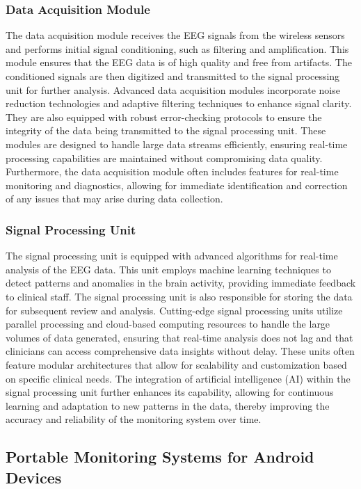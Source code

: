 \documentclass[12pt,journal,compsoc]{IEEEtran}
\begin{document}
\subsubsection{Data Acquisition Module}

The data acquisition module receives the EEG signals from the wireless sensors and performs initial signal conditioning, such as filtering and amplification. This module ensures that the EEG data is of high quality and free from artifacts. The conditioned signals are then digitized and transmitted to the signal processing unit for further analysis. Advanced data acquisition modules incorporate noise reduction technologies and adaptive filtering techniques to enhance signal clarity. They are also equipped with robust error-checking protocols to ensure the integrity of the data being transmitted to the signal processing unit. These modules are designed to handle large data streams efficiently, ensuring real-time processing capabilities are maintained without compromising data quality. Furthermore, the data acquisition module often includes features for real-time monitoring and diagnostics, allowing for immediate identification and correction of any issues that may arise during data collection.

\subsubsection{Signal Processing Unit}

The signal processing unit is equipped with advanced algorithms for real-time analysis of the EEG data. This unit employs machine learning techniques to detect patterns and anomalies in the brain activity, providing immediate feedback to clinical staff. The signal processing unit is also responsible for storing the data for subsequent review and analysis. Cutting-edge signal processing units utilize parallel processing and cloud-based computing resources to handle the large volumes of data generated, ensuring that real-time analysis does not lag and that clinicians can access comprehensive data insights without delay. These units often feature modular architectures that allow for scalability and customization based on specific clinical needs. The integration of artificial intelligence (AI) within the signal processing unit further enhances its capability, allowing for continuous learning and adaptation to new patterns in the data, thereby improving the accuracy and reliability of the monitoring system over time.

\subsection{Portable Monitoring Systems for Android Devices}
\end{document}

